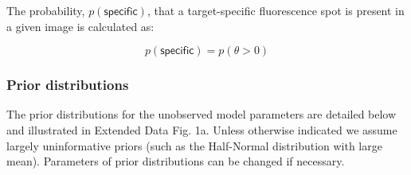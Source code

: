 The probability, $p(\mathsf{specific})$, that a target-specific fluorescence spot is present in a given image is calculated as:

\begin{equation}
    p(\mathsf{specific}) = p(\theta > 0)
\end{equation}

\subsubsection*{Prior distributions}

The prior distributions for the unobserved model parameters are detailed below and illustrated in Extended Data Fig. 1a. Unless otherwise indicated we assume largely uninformative priors (such as the Half-Normal distribution with large mean). Parameters of prior distributions can be changed if necessary.
%
